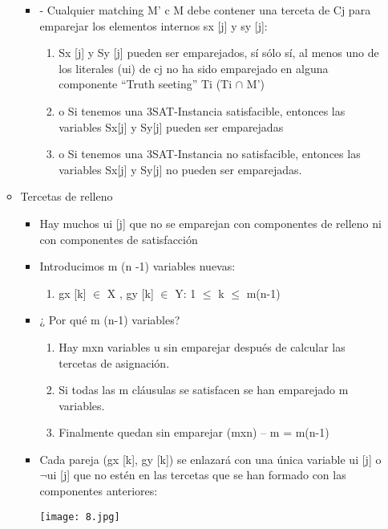 \documentclass[a4paper,10pt]{article}
\begin{document}
\begin{itemize}
\begin{itemize}
\begin{itemize}
							\item -	Cualquier matching M' c M debe contener una terceta de Cj para emparejar los elementos internos sx [j] y sy [j]: 
							\begin{enumerate}
								\item Sx [j] y Sy [j] pueden ser emparejados, sí sólo sí, al menos uno de los literales (ui) de cj no ha sido emparejado en alguna componente “Truth seeting” Ti (Ti $\cap$ M') 
								\item o	Si tenemos una 3SAT-Instancia satisfacible, entonces las variables Sx[j] y Sy[j] pueden ser emparejadas 
								\item o	Si tenemos una 3SAT-Instancia no satisfacible, entonces las variables Sx[j] y Sy[j] no pueden ser emparejadas.
							\end{enumerate}
						\end{itemize}
					\item Tercetas de relleno
						\begin{itemize}
							\item Hay muchos ui [j] que no se emparejan con componentes de relleno ni con componentes de satisfacción
							\item Introducimos m (n -1) variables nuevas: 
								\begin{enumerate}
									\item gx [k] $\in$ X , gy [k] $\in$ Y: 1 $\leq$ k $\leq$ m(n-1) 
								\end{enumerate}
							\item ¿ Por qué m (n-1) variables? 
								\begin{enumerate}
									\item Hay mxn variables u sin emparejar después de calcular las tercetas de asignación. 
									\item Si todas las m cláusulas se satisfacen se han emparejado m variables. 
									\item Finalmente quedan sin emparejar (mxn) – m = m(n-1)
								\end{enumerate}
							\item Cada pareja (gx [k], gy [k]) se enlazará con una única variable ui [j] o $\neg$ui [j] que no estén en las tercetas que se han formado con las componentes anteriores:
							
								\texttt{[image: 8.jpg]}
							
						\end{itemize}
				\end{itemize}
				

\end{itemize}
\end{document}
